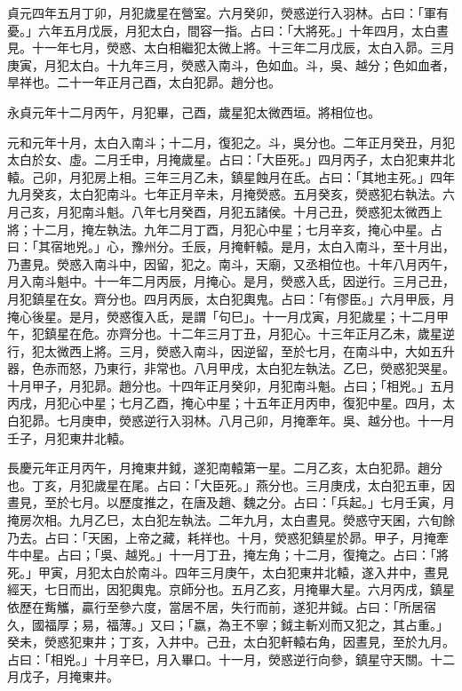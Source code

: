 \begin{pinyinscope}
 貞元四年五月丁卯，月犯歲星在營室。六月癸卯，熒惑逆行入羽林。占曰：「軍有憂。」六年五月戊辰，月犯太白，間容一指。占曰：「大將死。」十年四月，太白晝見。十一年七月，熒惑、太白相繼犯太微上將。十三年二月戊辰，太白入昴。三月庚寅，月犯太白。十九年三月，熒惑入南斗，色如血。斗，吳、越分；色如血者，旱祥也。二十一年正月己酉，太白犯昴。趙分也。



 永貞元年十二月丙午，月犯畢，己酉，歲星犯太微西垣。將相位也。



 元和元年十月，太白入南斗；十二月，復犯之。斗，吳分也。二年正月癸丑，月犯太白於女、虛。二月壬申，月掩歲星。占曰：「大臣死。」四月丙子，太白犯東井北轅。己卯，月犯房上相。三年三月乙未，鎮星蝕月在氐。占曰：「其地主死。」四年九月癸亥，太白犯南斗。七年正月辛未，月掩熒惑。五月癸亥，熒惑犯右執法。六月己亥，月犯南斗魁。八年七月癸酉，月犯五諸侯。十月己丑，熒惑犯太微西上將；十二月，掩左執法。九年二月丁酉，月犯心中星；七月辛亥，掩心中星。占曰：「其宿地兇。」心，豫州分。壬辰，月掩軒轅。是月，太白入南斗，至十月出，乃晝見。熒惑入南斗中，因留，犯之。南斗，天廟，又丞相位也。十年八月丙午，月入南斗魁中。十一年二月丙辰，月掩心。是月，熒惑入氐，因逆行。三月己丑，月犯鎮星在女。齊分也。四月丙辰，太白犯輿鬼。占曰：「有僇臣。」六月甲辰，月掩心後星。是月，熒惑復入氐，是謂「句巳」。十一月戊寅，月犯歲星；十二月甲午，犯鎮星在危。亦齊分也。十二年三月丁丑，月犯心。十三年正月乙未，歲星逆行，犯太微西上將。三月，熒惑入南斗，因逆留，至於七月，在南斗中，大如五升器，色赤而怒，乃東行，非常也。八月甲戌，太白犯左執法。乙巳，熒惑犯哭星。十月甲子，月犯昴。趙分也。十四年正月癸卯，月犯南斗魁。占曰；「相兇。」五月丙戌，月犯心中星；七月乙酉，掩心中星；十五年正月丙申，復犯中星。四月，太白犯昴。七月庚申，熒惑逆行入羽林。八月己卯，月掩牽年。吳、越分也。十一月壬子，月犯東井北轅。



 長慶元年正月丙午，月掩東井鉞，遂犯南轅第一星。二月乙亥，太白犯昴。趙分也。丁亥，月犯歲星在尾。占曰：「大臣死。」燕分也。三月庚戌，太白犯五車，因晝見，至於七月。以歷度推之，在唐及趙、魏之分。占曰：「兵起。」七月壬寅，月掩房次相。九月乙巳，太白犯左執法。二年九月，太白晝見。熒惑守天囷，六旬餘乃去。占曰：「天囷，上帝之藏，耗祥也。十月，熒惑犯鎮星於昴。甲子，月掩牽牛中星。占曰；「吳、越兇。」十一月丁丑，掩左角；十二月，復掩之。占曰：「將死。」甲寅，月犯太白於南斗。四年三月庚午，太白犯東井北轅，遂入井中，晝見經天，七日而出，因犯輿鬼。京師分也。五月乙亥，月掩畢大星。六月丙戌，鎮星依歷在觜觿，贏行至參六度，當居不居，失行而前，遂犯井鉞。占曰：「所居宿久，國福厚；易，福薄。」又曰；「嬴，為王不寧；鉞主斬刈而又犯之，其占重。」癸未，熒惑犯東井；丁亥，入井中。己丑，太白犯軒轅右角，因晝見，至於九月。占曰：「相兇。」十月辛巳，月入畢口。十一月，熒惑逆行向參，鎮星守天關。十二月戊子，月掩東井。




\end{pinyinscope}

